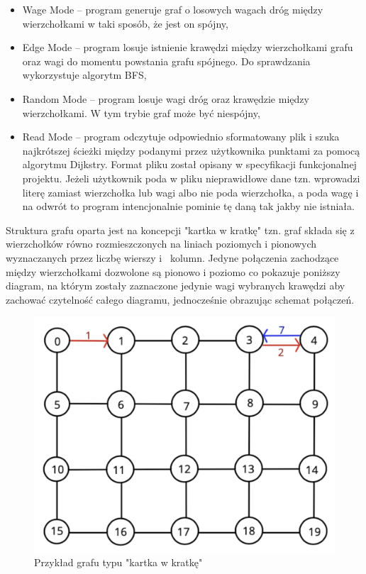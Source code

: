 \documentclass[10pt, a4paper]{report}
\begin{document}
    \begin{itemize}
        \item Wage Mode – program generuje graf o losowych wagach dróg między wierzchołkami w taki sposób, że jest on spójny,
        \item Edge Mode – program losuje istnienie krawędzi między wierzchołkami grafu oraz wagi do momentu powstania 
        grafu spójnego. Do sprawdzania wykorzystuje algorytm BFS,
        \item Random Mode – program losuje wagi dróg oraz krawędzie między wierzchołkami. W tym trybie graf może być niespójny,
        \item Read Mode -- program odczytuje odpowiednio sformatowany plik i szuka najkrótszej ścieżki
        między podanymi przez użytkownika punktami za pomocą algorytmu Dijkstry. Format pliku został opisany w specyfikacji funkcjonalnej projektu. Jeżeli użytkownik poda w pliku nieprawidłowe dane
        tzn. wprowadzi literę zamiast wierzchołka lub wagi albo nie poda wierzchołka, a poda wagę i na odwrót to program intencjonalnie pominie tę daną tak jakby nie istniała.
    \end{itemize}
    Struktura grafu oparta jest na koncepcji "kartka w kratkę" tzn. graf składa się z wierzchołków równo rozmieszczonych na liniach poziomych 
    i pionowych wyznaczanych przez liczbę wierszy i~ kolumn. Jedyne połączenia zachodzące między wierzchołkami dozwolone są  pionowo i poziomo co pokazuje poniższy diagram, na którym zostały zaznaczone jedynie wagi wybranych krawędzi aby zachować czytelność całego diagramu, jednocześnie obrazując schemat połączeń.
    \begin{figure}[ht]
        \begin{center}
            \includegraphics[scale=0.15]{graph.png}
            \caption{Przykład grafu typu "kartka w kratkę"}
        \end{center}
    \end{figure}
\end{document}
